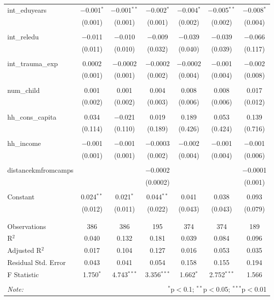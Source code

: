 \begin{table}[H]
\begin{tabular}{@{\extracolsep{4pt}}lcccccc}
 int\_eduyears & $-$0.001$^{*}$ & $-$0.001$^{**}$ & $-$0.002$^{*}$ & $-$0.004$^{*}$ & $-$0.005$^{**}$ & $-$0.008$^{*}$ \\ 
  & (0.001) & (0.001) & (0.001) & (0.002) & (0.002) & (0.004) \\ 
  & & & & & & \\ 
 int\_reledu & $-$0.011 & $-$0.010 & $-$0.009 & $-$0.039 & $-$0.039 & $-$0.066 \\ 
  & (0.011) & (0.010) & (0.032) & (0.040) & (0.039) & (0.117) \\ 
  & & & & & & \\ 
 int\_trauma\_exp & 0.0002 & $-$0.0002 & $-$0.0002 & $-$0.0002 & $-$0.001 & $-$0.002 \\ 
  & (0.001) & (0.001) & (0.002) & (0.004) & (0.004) & (0.008) \\ 
  & & & & & & \\ 
 num\_child & 0.001 & 0.001 & 0.004 & 0.008 & 0.008 & 0.017 \\ 
  & (0.002) & (0.002) & (0.003) & (0.006) & (0.006) & (0.012) \\ 
  & & & & & & \\ 
 hh\_cons\_capita & 0.034 & $-$0.021 & 0.019 & 0.189 & 0.053 & 0.139 \\ 
  & (0.114) & (0.110) & (0.189) & (0.426) & (0.424) & (0.716) \\ 
  & & & & & & \\ 
 hh\_income & $-$0.001 & $-$0.001 & $-$0.0003 & $-$0.002 & $-$0.001 & $-$0.001 \\ 
  & (0.001) & (0.001) & (0.002) & (0.004) & (0.004) & (0.006) \\ 
  & & & & & & \\ 
 distancekmfromcamps &  &  & $-$0.0002 &  &  & $-$0.0001 \\ 
  &  &  & (0.0002) &  &  & (0.001) \\ 
  & & & & & & \\ 
 Constant & 0.024$^{**}$ & 0.021$^{*}$ & 0.044$^{**}$ & 0.041 & 0.038 & 0.093 \\ 
  & (0.012) & (0.011) & (0.022) & (0.043) & (0.043) & (0.079) \\ 
  & & & & & & \\ 
\hline \\[-1.8ex] 
Observations & 386 & 386 & 195 & 374 & 374 & 189 \\ 
R$^{2}$ & 0.040 & 0.132 & 0.181 & 0.039 & 0.084 & 0.096 \\ 
Adjusted R$^{2}$ & 0.017 & 0.104 & 0.127 & 0.016 & 0.053 & 0.035 \\ 
Residual Std. Error & 0.043 & 0.041 & 0.054 & 0.158 & 0.155 & 0.194 \\ 
F Statistic & 1.750$^{*}$ & 4.743$^{***}$ & 3.356$^{***}$ & 1.662$^{*}$ & 2.752$^{***}$ & 1.566 \\ 
\hline 
\hline \\[-1.8ex] 
\textit{Note:}  & \multicolumn{6}{r}{$^{*}$p$<$0.1; $^{**}$p$<$0.05; $^{***}$p$<$0.01} \\ 
\end{tabular} 
\end{table} 
